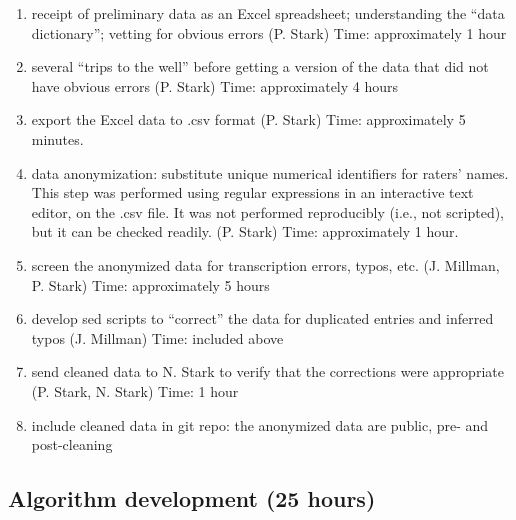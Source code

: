 \documentclass[]{article}
\begin{document}
  \begin{enumerate}
  \def\labelenumii{\roman{enumii}.}
  \itemsep1pt\parskip0pt
  \item
    receipt of preliminary data as an Excel spreadsheet; understanding
    the ``data dictionary''; vetting for obvious errors (P. Stark) Time:
    approximately 1 hour
  \item
    several ``trips to the well'' before getting a version of the data
    that did not have obvious errors (P. Stark) Time: approximately 4
    hours
  \item
    export the Excel data to .csv format (P. Stark) Time: approximately
    5 minutes.
  \item
    data anonymization: substitute unique numerical identifiers for
    raters' names. This step was performed using regular expressions in
    an interactive text editor, on the .csv file. It was not performed
    reproducibly (i.e., not scripted), but it can be checked readily.
    (P. Stark) Time: approximately 1 hour.
  \item
    screen the anonymized data for transcription errors, typos, etc. (J.
    Millman, P. Stark) Time: approximately 5 hours
  \item
    develop sed scripts to ``correct'' the data for duplicated entries
    and inferred typos (J. Millman) Time: included above
  \item
    send cleaned data to N. Stark to verify that the corrections were
    appropriate (P. Stark, N. Stark) Time: 1 hour
  \item
    include cleaned data in git repo: the anonymized data are public,
    pre- and post-cleaning
  \end{enumerate}
  
\subsection{Algorithm development (25 hours)}
\end{document}
